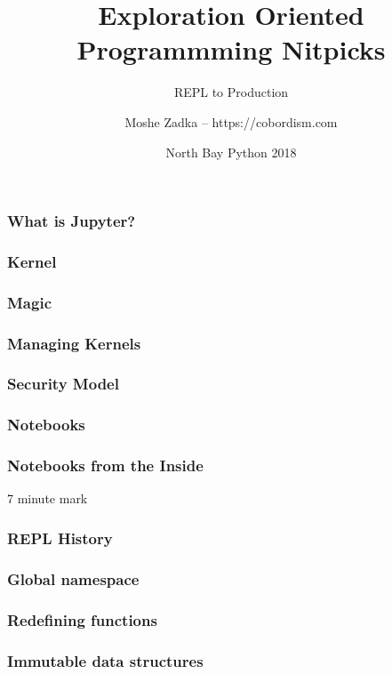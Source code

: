 \usepackage[utf8]{inputenc}
\usepackage{listings}
\usepackage{textcomp}

\title{Exploration Oriented Programmming Nitpicks}
\subtitle{REPL to Production}
\author{Moshe Zadka -- https://cobordism.com}
\date{North Bay Python 2018}
 

 
\begin{titlepage}
\maketitle
\end{titlepage}

\frame{\titlepage}

\begin{frame}
\frametitle{What is Jupyter?}
\end{frame}

\begin{frame}
\frametitle{Kernel}
\end{frame}

\begin{frame}
\frametitle{Magic}
\end{frame}

\begin{frame}
\frametitle{Managing Kernels}
\end{frame}

\begin{frame}
\frametitle{Security Model}
\end{frame}

\begin{frame}
\frametitle{Notebooks}
\end{frame}

\begin{frame}
\frametitle{Notebooks from the Inside}
\end{frame}

7 minute mark

\begin{frame}
\frametitle{REPL History}
\end{frame}

\begin{frame}
\frametitle{Global namespace}
\end{frame}

\begin{frame}
\frametitle{Redefining functions}
\end{frame}

\begin{frame}
\frametitle{Immutable data structures}
\end{frame}

